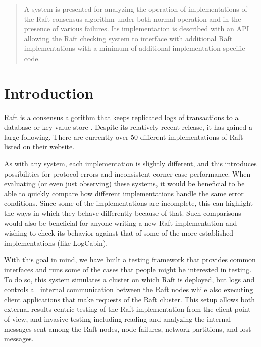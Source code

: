 \documentclass[UTF8]{article}
\begin{document}
 

\setlength\parindent{24pt}

\begin{abstract}
	
A system is presented for analyzing the operation of implementations of the Raft consensus algorithm under both normal operation and in the presence of various failures. Its implementation is described with an API allowing the Raft checking system to interface with additional Raft implementations with a minimum of additional implementation-specific code.

\end{abstract} 

\section{Introduction}

Raft is a consensus algorithm that keeps replicated logs of transactions to a database or key-value store \cite{raftPaper}. Despite its relatively recent release, it has gained a large following. There are currently over 50 different implementations of Raft listed on their website.
 
As with any system, each implementation is slightly different, and this introduces possibilities for protocol errors and inconsistent corner case performance. When evaluating (or even just observing) these systems, it would be beneficial to be able to quickly compare how different implementations handle the same error conditions. Since some of the implementations are incomplete, this can highlight the ways in which they behave differently because of that. Such comparisons would also be beneficial for anyone writing a new Raft implementation and wishing to check its behavior against that of some of the more established implementations (like LogCabin). 

With this goal in mind, we have built a testing framework that provides common interfaces and runs some of the cases that people might be interested in testing. To do so, this system simulates a cluster on which Raft is deployed, but logs and controls all internal communication between the Raft nodes while also executing client applications that make requests of the Raft cluster. This setup allows both external results-centric testing of the Raft implementation from the client point of view, and invasive testing including reading and analyzing the internal messages sent among the Raft nodes, node failures, network partitions, and lost messages.
\end{document}
